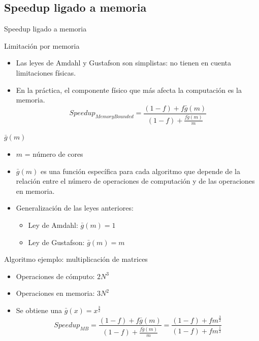 \documentclass[utf8]{beamer}
\begin{document}
\subsection*{Speedup ligado a memoria}

\begin{frame}[allowframebreaks]{Speedup ligado a memoria}
    \begin{block}{Limitación por memoria}
        \begin{itemize}
        \item Las leyes de Amdahl y Gustafson son simplistas: no tienen en cuenta limitaciones físicas.
        \item En la práctica, el componente físico que más afecta la computación es la memoria.
        $$ Speedup_{MemoryBounded} = \frac{(1-f) + f \bar{g}(m)}{(1-f) + \frac{f\bar{g}(m)}{m}} $$
        \end{itemize}
    \end{block}
    \begin{block}{$\bar{g}(m)$}
        \begin{itemize}
	    \item $m$ = número de cores
            \item $\bar{g}(m)$ es una función específica para cada algoritmo que depende de la relación entre el número de operaciones de computación y de las operaciones en memoria.
            \item Generalización de las leyes anteriores:
            \begin{itemize}
                \item Ley de Amdahl: $\bar{g}(m) = 1$
                \item Ley de Gustafson: $\bar{g}(m) = m$
            \end{itemize}
        \end{itemize}
    \end{block}
    \begin{block}{Algoritmo ejemplo: multiplicación de matrices}
        \begin{itemize}
            \item Operaciones de cómputo: $2N^3$
            \item Operaciones en memoria: $3N^2$
            \item Se obtiene una $\bar{g}(x) = x^\frac{3}{2}$
            $$ Speedup_{MB} = \frac{(1-f) + f \bar{g}(m)}{(1-f) + \frac{f\bar{g}(m)}{m}} = \frac{(1-f) + f m^\frac{3}{2}}{(1-f) + fm^\frac{1}{2}} $$
        \end{itemize}

\end{block}
\end{frame}
\end{document}
